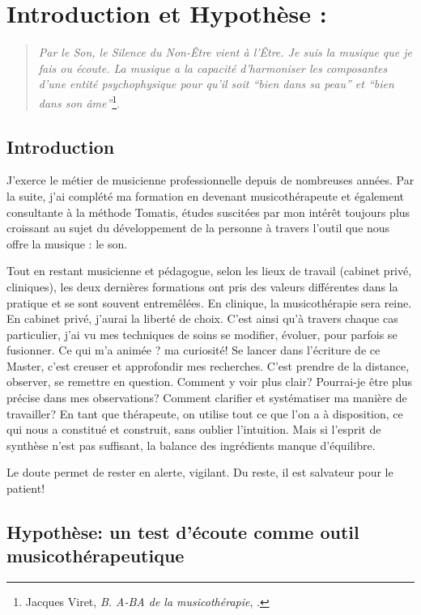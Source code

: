 \chapter{Introduction et Hypothèse : }
\begin{quotation}
\emph{Par le Son, le Silence du Non-Être vient à l'Être. Je suis
la musique que je fais ou écoute. La musique a la capacité d'harmoniser
les composantes d'une entité psychophysique pour qu'il soit ``bien
dans sa peau'' et ``bien dans son âme''}\footnote{Jacques Viret, \emph{B. A-BA de la musicothérapie}, \cite{Viret2007}.}.
\end{quotation}
\section{Introduction}J'exerce le métier de musicienne professionnelle depuis de nombreuses
années. Par la suite, j'ai complété ma formation en devenant musicothérapeute et également consultante à la méthode Tomatis, études suscitées
par mon intérêt toujours plus croissant au sujet du développement de la personne
à travers l'outil que nous offre la musique : le son.

Tout en restant musicienne et pédagogue, selon les lieux de travail (cabinet privé, cliniques), les deux dernières formations ont pris des valeurs différentes dans la pratique et se sont souvent entremêlées. En clinique, la musicothérapie sera reine. En cabinet
privé, j'aurai la liberté de choix.
C'est ainsi qu'à travers chaque cas particulier,
j'ai vu mes techniques de soins se modifier, évoluer,
pour parfois se fusionner. 
Ce qui m'a animée ? ma curiosité! Se lancer dans l'écriture de ce Master, c'est creuser et approfondir mes recherches. C'est prendre de la distance, observer, se remettre en question. 
Comment y voir plus clair? Pourrai-je être plus précise dans mes observations? Comment 
clarifier et systématiser ma manière de travailler? En tant que thérapeute, on utilise tout ce que l'on a  à disposition, ce qui nous a constitué et construit, sans oublier l'intuition. Mais si  l'esprit de synthèse n'est pas suffisant, la balance  des ingrédients manque d'équilibre. 

 Le doute permet de rester en alerte, vigilant. Du reste, il est salvateur pour le patient!


\section{Hypothèse: un test d'écoute comme outil musicothérapeutique}



